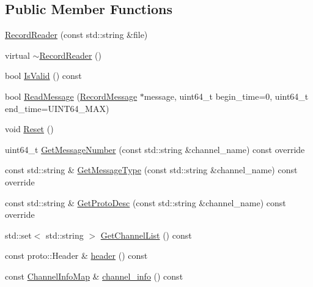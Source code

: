 \subsection*{Public Member Functions}
\begin{DoxyCompactItemize}
\item 
\hyperlink{classapollo_1_1cyber_1_1record_1_1RecordReader_aa87c1931b92dfde42e412d6ad9d6bf2f}{Record\-Reader} (const std\-::string \&file)
\item 
virtual \hyperlink{classapollo_1_1cyber_1_1record_1_1RecordReader_ae4c7635d67b06eefabc036e6830458d7}{$\sim$\-Record\-Reader} ()
\item 
bool \hyperlink{classapollo_1_1cyber_1_1record_1_1RecordReader_aa36b991b065d89b0eaeab25f1537828d}{Is\-Valid} () const 
\item 
bool \hyperlink{classapollo_1_1cyber_1_1record_1_1RecordReader_a608943803f7feb1bdac5cf66477c4b0e}{Read\-Message} (\hyperlink{structapollo_1_1cyber_1_1record_1_1RecordMessage}{Record\-Message} $\ast$message, uint64\-\_\-t begin\-\_\-time=0, uint64\-\_\-t end\-\_\-time=U\-I\-N\-T64\-\_\-\-M\-A\-X)
\item 
void \hyperlink{classapollo_1_1cyber_1_1record_1_1RecordReader_a1b397349667341f7d100f1a61eee6c3b}{Reset} ()
\item 
uint64\-\_\-t \hyperlink{classapollo_1_1cyber_1_1record_1_1RecordReader_aac1723c2d51a327d3e36899c3f15319b}{Get\-Message\-Number} (const std\-::string \&channel\-\_\-name) const override
\item 
const std\-::string \& \hyperlink{classapollo_1_1cyber_1_1record_1_1RecordReader_a722df636d4f17d66c908bb3433a0b1cf}{Get\-Message\-Type} (const std\-::string \&channel\-\_\-name) const override
\item 
const std\-::string \& \hyperlink{classapollo_1_1cyber_1_1record_1_1RecordReader_a5618fb95fdcf0660dc9ebdff3a14a869}{Get\-Proto\-Desc} (const std\-::string \&channel\-\_\-name) const override
\item 
std\-::set$<$ std\-::string $>$ \hyperlink{classapollo_1_1cyber_1_1record_1_1RecordReader_af0c4ee41b2ede4245a826762b4d32a5f}{Get\-Channel\-List} () const 
\item 
const proto\-::\-Header \& \hyperlink{classapollo_1_1cyber_1_1record_1_1RecordReader_ada984304d256257ebb52211b22bc16b5}{header} () const 
\item 
const \hyperlink{classapollo_1_1cyber_1_1record_1_1RecordReader_a3eb18b9cfa2630f3e4680e89d4ac50be}{Channel\-Info\-Map} \& \hyperlink{classapollo_1_1cyber_1_1record_1_1RecordReader_af483fb03206fb8a4a6d54d84f9756b40}{channel\-\_\-info} () const 
\end{DoxyCompactItemize}
